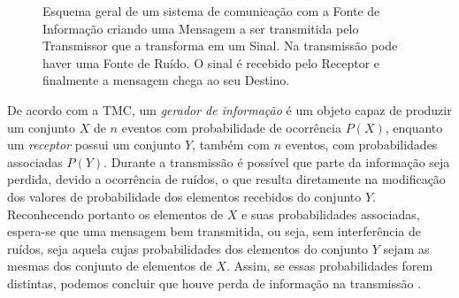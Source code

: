 \documentclass[11pt,oneside,brazil,hidelinks,article,sumario=tradicional,a4paper]{abntex2}
\begin{document}
\begin{figure}[ht!]
  \centering
  \caption{Esquema geral de um sistema de comunicação com a Fonte de Informação criando uma Mensagem a ser transmitida pelo Transmissor que a transforma em um Sinal. Na transmissão pode haver uma Fonte de Ruído. O sinal é recebido pelo Receptor e finalmente a mensagem chega ao seu Destino.}\label{comunicshannon}
\end{figure}

De acordo com  a TMC, um \textit{gerador de informação} é um objeto capaz de produzir um conjunto $X$ de $n$ eventos com probabilidade de ocorrência $P(X)$, enquanto um \textit{receptor} possui um conjunto $Y$, também com $n$ eventos, com probabilidades associadas $P(Y)$. Durante a transmissão é possível que parte da informação seja perdida, devido a ocorrência de ruídos, o que resulta diretamente na modificação dos valores de probabilidade dos elementos recebidos do conjunto $Y$. Reconhecendo portanto os elementos de $X$ e suas probabilidades associadas, espera-se que uma mensagem bem transmitida, ou seja, sem interferência de ruídos, seja aquela cujas probabilidades dos elementos do conjunto $Y$ sejam as mesmas dos conjunto de elementos de $X$. Assim, se essas probabilidades forem distintas, podemos concluir que houve perda de informação na transmissão \cite{mathematical}.
\end{document}
